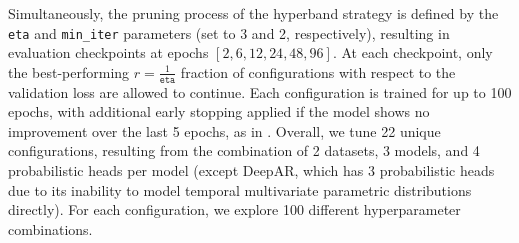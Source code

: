 \documentclass[a4paper,oneside,bibliography=totoc]{scrbook}
\begin{document}
Simultaneously, the pruning process of the hyperband strategy is defined by the \texttt{eta} and \texttt{min\_iter} parameters (set to 3 and 2, respectively), resulting in evaluation checkpoints at epochs $[2, 6, 12, 24, 48, 96]$. At each checkpoint, only the best-performing $r = \frac{1}{\texttt{eta}}$ fraction of configurations with respect to the validation loss are allowed to continue.
Each configuration is trained for up to 100 epochs, with additional early stopping applied if the model shows no improvement over the last 5 epochs, as in \citet{shang_ada-mshyper_2024}. 
Overall, we tune 22 unique configurations, resulting from the combination of 2 datasets, 3 models, and 4 probabilistic heads per model (except DeepAR, which has 3 probabilistic heads due to its inability to model temporal multivariate parametric distributions directly). For each configuration, we explore 100 different hyperparameter combinations.
\end{document}
